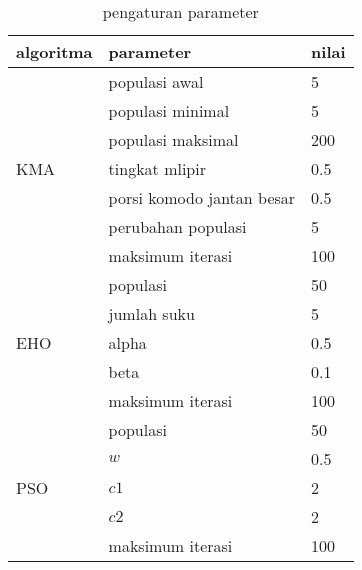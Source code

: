 \begin{table}[h!]
\centering
\caption{pengaturan parameter}
\label{tab:pengaturan-parameter}
\begin{tabular}{|l|l|l|}
\hline
algoritma            & parameter                 & nilai \\ \hline
\multirow[t]{7}{*}{KMA} & populasi awal             & 5     \\ \cline{2-3} 
                     & populasi minimal          & 5     \\ \cline{2-3} 
                     & populasi maksimal         & 200   \\ \cline{2-3} 
                     & tingkat mlipir            & 0.5   \\ \cline{2-3} 
                     & porsi komodo jantan besar & 0.5   \\ \cline{2-3} 
                     & perubahan populasi        & 5     \\ \cline{2-3} 
                     & maksimum iterasi          & 100   \\ \hline
\multirow[t]{5}{*}{EHO} & populasi                  & 50    \\ \cline{2-3} 
                     & jumlah suku               & 5     \\ \cline{2-3} 
                     & alpha                     & 0.5   \\ \cline{2-3} 
                     & beta                      & 0.1   \\ \cline{2-3} 
                     & maksimum iterasi          & 100   \\ \hline
\multirow[t]{5}{*}{PSO} & populasi                  & 50    \\ \cline{2-3} 
                     & $w$               & 0.5     \\ \cline{2-3} 
                     & $c1$                     & 2   \\ \cline{2-3} 
                     & $c2$                      & 2   \\ \cline{2-3} 
                     & maksimum iterasi          & 100   \\ \hline
\end{tabular}
\end{table}

